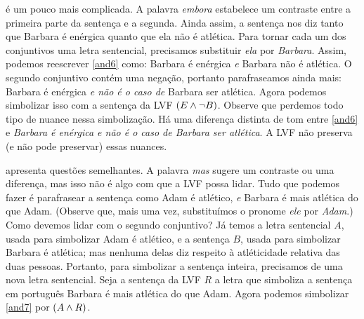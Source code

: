  é um pouco mais complicada. A palavra \emph{embora}
estabelece um contraste entre a primeira parte da sentença e a segunda.
Ainda assim, a sentença nos diz tanto que Barbara é enérgica quanto que
ela não é atlética. Para tornar cada um dos conjuntivos uma letra
sentencial, precisamos substituir \emph{ela} por \emph{Barbara}. Assim,
podemos reescrever \cref*{and6} como: Barbara é enérgica
\emph{e} Barbara não é atlética. O segundo conjuntivo contém uma negação,
portanto parafraseamos ainda mais: Barbara é enérgica
\emph{e não é o caso de} Barbara ser atlética. Agora podemos simbolizar
isso com a sentença da LVF $(E\wedge\neg B)$. Observe que perdemos todo
tipo de nuance nessa simbolização. Há uma diferença distinta de tom
entre \cref*{and6} e \emph{Barbara é enérgica e não é o caso de
Barbara ser atlética}. A LVF não preserva (e não pode preservar) essas
nuances.

 apresenta questões semelhantes. A palavra \emph{mas} sugere
um contraste ou uma diferença, mas isso não é algo com que a LVF possa
lidar. Tudo que podemos fazer é parafrasear a sentença como
Adam é atlético, \emph{e} Barbara é mais atlética do que
Adam. (Observe que, mais uma vez, substituímos o pronome \emph{ele} por
\emph{Adam}.) Como devemos lidar com o segundo conjuntivo? Já temos a
letra sentencial $A$, usada para simbolizar Adam é atlético, e a sentença
$B$, usada para simbolizar Barbara é atlética; mas nenhuma delas diz
respeito à atléticidade relativa das duas pessoas. Portanto, para
simbolizar a sentença inteira, precisamos de uma nova letra sentencial.
Seja a sentença da LVF $R$ a letra que simboliza a sentença em português
Barbara é mais atlética do que Adam. Agora podemos simbolizar
\cref*{and7} por $(A \wedge R)$.


